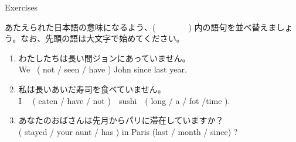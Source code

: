 \documentclass[aspectratio=169,xcolor={dvipsnames,table}]{beamer}
\begin{document}
\begin{frame}[plain]{Exercises}
 
あたえられた日本語の意味になるよう、(~~~~~~~~) 内の語句を並べ替えましょう。なお、先頭の語は大文字で始めてください。

\begin{enumerate}
 \item わたしたちは長い間ジョンにあっていません。\\
We  ~( not / seen / have ) John since last year.\\
 \item  私は長いあいだ寿司を食べていません。\\
I ~~( eaten /  have / not )~~sushi~~( long / a / fot /time ).\\
 \item  あなたのおばさんは先月からパリに滞在していますか？\bcdfrance\\
( stayed /  your aunt / has ) in Paris (last / month / since) ? \\
\end{enumerate}
\end{frame}
\end{document}
